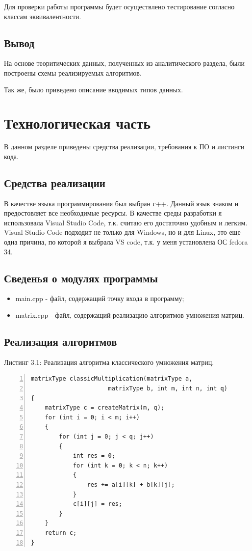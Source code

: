 \documentclass[12pt,a4paper]{report}
\begin{document}
Для проверки работы программы будет осуществлено тестирование согласно классам эквивалентности.

\section*{Вывод}

На основе теоритических данных, полученных из аналитического раздела, были построены схемы реализируемых алгоритмов.

Так же, было приведено описание вводимых типов данных.

\newpage
\chapter{Технологическая часть} 

В данном разделе приведены средства реализации, требования к ПО и листинги кода.

\section{Средства реализации}
В качестве языка программирования был выбран с++. Данный язык знаком и предостовляет все необходимые ресурсы.
В качестве среды разработки я использовала Visual Studio Code, т.к. считаю его достаточно удобным и легким.
Visual Studio Code подходит не только для  Windows, но и для Linux, это еще одна причина, по которой я выбрала VS code, т.к. у меня установлена ОС  fedora 34.

\section{Сведенья о модулях программы}

\begin{itemize}
	\item main.cpp - файл, содержащий точку входа в программу;
	\item matrix.cpp - файл, содержащий реализацию алгоритмов умножения матриц.
\end{itemize}

\section{Реализация алгоритмов}





\noindent\textrm{Листинг 3.1: Реализация алгоритма классического умножения матриц.}
\begin{lstlisting}[frame=single, numbers=left]
matrixType classicMultiplication(matrixType a, 
                      matrixType b, int m, int n, int q)
{
    matrixType c = createMatrix(m, q);
    for (int i = 0; i < m; i++)
    {
        for (int j = 0; j < q; j++)
        {
            int res = 0;
            for (int k = 0; k < n; k++)
            {
                res += a[i][k] + b[k][j];
            }
            c[i][j] = res;
        }
    }
    return c;
}
\end{lstlisting}
\end{document}
